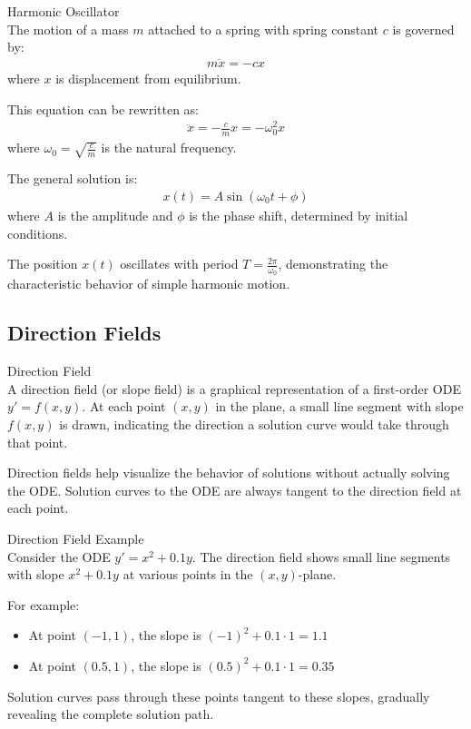 \begin{example2}{Harmonic Oscillator}\\
The motion of a mass $m$ attached to a spring with spring constant $c$ is governed by:
\begin{align*}
m\ddot{x} = -cx
\end{align*}
where $x$ is displacement from equilibrium.

This equation can be rewritten as:
\begin{align*}
\ddot{x} = -\frac{c}{m}x = -\omega_0^2 x
\end{align*}
where $\omega_0 = \sqrt{\frac{c}{m}}$ is the natural frequency.

The general solution is:
\begin{align*}
x(t) = A \sin(\omega_0 t + \phi)
\end{align*}
where $A$ is the amplitude and $\phi$ is the phase shift, determined by initial conditions.

The position $x(t)$ oscillates with period $T = \frac{2\pi}{\omega_0}$, demonstrating the characteristic behavior of simple harmonic motion.
\end{example2}

\subsection{Direction Fields}

\begin{definition}{Direction Field}\\
A direction field (or slope field) is a graphical representation of a first-order ODE $y' = f(x,y)$. At each point $(x,y)$ in the plane, a small line segment with slope $f(x,y)$ is drawn, indicating the direction a solution curve would take through that point.

Direction fields help visualize the behavior of solutions without actually solving the ODE. Solution curves to the ODE are always tangent to the direction field at each point.
\end{definition}

\begin{example2}{Direction Field Example}\\
Consider the ODE $y' = x^2 + 0.1y$. The direction field shows small line segments with slope $x^2 + 0.1y$ at various points in the $(x,y)$-plane.

For example:
\begin{itemize}
    \item At point $(-1, 1)$, the slope is $(-1)^2 + 0.1 \cdot 1 = 1.1$
    \item At point $(0.5, 1)$, the slope is $(0.5)^2 + 0.1 \cdot 1 = 0.35$
\end{itemize}

Solution curves pass through these points tangent to these slopes, gradually revealing the complete solution path.
\end{example2}

